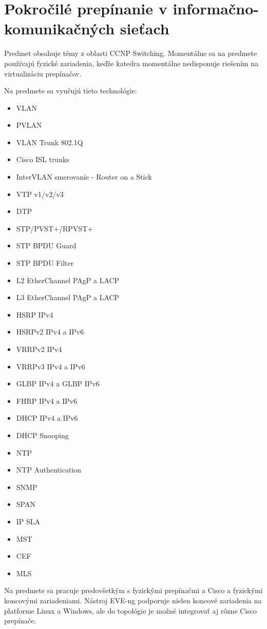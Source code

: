 \section{Pokročilé prepínanie v informačno-komunikačných sieťach}

Predmet obsahuje témy z oblasti CCNP Switching. Momentálne sa na predmete používajú fyzické zariadenia, keďže katedra momentálne nedisponuje riešením na virtualizáciu prepínačov.

Na predmete sa vyučujú tieto technológie:

\begin{itemize}
    \item VLAN
    \item PVLAN
    \item VLAN Trunk 802.1Q
    \item Cisco ISL trunks
    \item InterVLAN smerovanie - Router on a Stick
    \item VTP v1/v2/v3
    \item DTP
    \item STP/PVST+/RPVST+
    \item STP BPDU Guard
    \item STP BPDU Filter
    \item L2 EtherChannel PAgP a LACP
    \item L3 EtherChannel PAgP a LACP
    \item HSRP IPv4 
    \item HSRPv2 IPv4 a IPv6 
    \item VRRPv2 IPv4 
    \item VRRPv3 IPv4 a IPv6 
    \item GLBP IPv4 a GLBP IPv6 
    \item FHRP IPv4 a IPv6 
    \item DHCP IPv4 a IPv6 
    \item DHCP Snooping
    \item NTP
    \item NTP Authentication
    \item SNMP
    \item SPAN
    \item IP SLA
    \item MST
    \item CEF
    \item MLS
\end{itemize}

Na predmete sa pracuje predovšetkým s fyzickými prepínačmi a Cisco a fyzickými koncovými zariadeniami. Nástroj EVE-ng podporuje nielen koncové zariadenia na platforme Linux a Windows, ale do topológie je možné integrovať aj rôzne Cisco prepínače.





